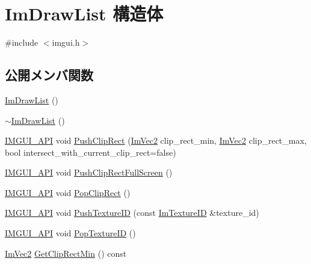 \hypertarget{struct_im_draw_list}{}\section{Im\+Draw\+List 構造体}
\label{struct_im_draw_list}


{\ttfamily \#include $<$imgui.\+h$>$}

\subsection*{公開メンバ関数}
\begin{DoxyCompactItemize}
\item 
\mbox{\hyperlink{struct_im_draw_list_a297376db2edb295095171dcc2dbed860}{Im\+Draw\+List}} ()
\item 
\mbox{\hyperlink{struct_im_draw_list_a19fd8d920c202cf8ba5f5c55c43d1d2a}{$\sim$\+Im\+Draw\+List}} ()
\item 
\mbox{\hyperlink{imgui_8h_a43829975e84e45d1149597467a14bbf5}{I\+M\+G\+U\+I\+\_\+\+A\+PI}} void \mbox{\hyperlink{struct_im_draw_list_acb34e2d3708616cae4567f3b4af06962}{Push\+Clip\+Rect}} (\mbox{\hyperlink{struct_im_vec2}{Im\+Vec2}} clip\+\_\+rect\+\_\+min, \mbox{\hyperlink{struct_im_vec2}{Im\+Vec2}} clip\+\_\+rect\+\_\+max, bool intersect\+\_\+with\+\_\+current\+\_\+clip\+\_\+rect=false)
\item 
\mbox{\hyperlink{imgui_8h_a43829975e84e45d1149597467a14bbf5}{I\+M\+G\+U\+I\+\_\+\+A\+PI}} void \mbox{\hyperlink{struct_im_draw_list_a0ab1ab409f0e269755e50a77901bae39}{Push\+Clip\+Rect\+Full\+Screen}} ()
\item 
\mbox{\hyperlink{imgui_8h_a43829975e84e45d1149597467a14bbf5}{I\+M\+G\+U\+I\+\_\+\+A\+PI}} void \mbox{\hyperlink{struct_im_draw_list_a44f40c59ca755f559020f5a7fa81103a}{Pop\+Clip\+Rect}} ()
\item 
\mbox{\hyperlink{imgui_8h_a43829975e84e45d1149597467a14bbf5}{I\+M\+G\+U\+I\+\_\+\+A\+PI}} void \mbox{\hyperlink{struct_im_draw_list_ac0dc0ecf692ab4c6ce58dd5381efb20d}{Push\+Texture\+ID}} (const \mbox{\hyperlink{imgui_8h_a364f4447ecbc4ca176145ccff9db6286}{Im\+Texture\+ID}} \&texture\+\_\+id)
\item 
\mbox{\hyperlink{imgui_8h_a43829975e84e45d1149597467a14bbf5}{I\+M\+G\+U\+I\+\_\+\+A\+PI}} void \mbox{\hyperlink{struct_im_draw_list_ade9286c5ca58753f7bd571b30e2ff76c}{Pop\+Texture\+ID}} ()
\item 
\mbox{\hyperlink{struct_im_vec2}{Im\+Vec2}} \mbox{\hyperlink{struct_im_draw_list_a9d83896d3eb434a9e1072d56523a2754}{Get\+Clip\+Rect\+Min}} () const

\end{DoxyCompactItemize}
